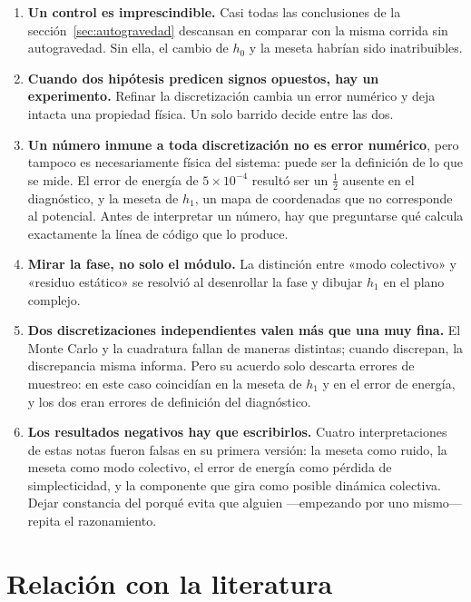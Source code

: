 \documentclass[11pt,a4paper]{article}
\theoremstyle{definition}
\begin{document}
\begin{enumerate}
  \item \textbf{Un control es imprescindible.} Casi todas las conclusiones de la
    sección~\ref{sec:autogravedad} descansan en comparar con la misma corrida sin
    autogravedad. Sin ella, el cambio de $h_0$ y la meseta habrían sido
    inatribuibles.

  \item \textbf{Cuando dos hipótesis predicen signos opuestos, hay un experimento.}
    Refinar la discretización cambia un error numérico y deja intacta una
    propiedad física. Un solo barrido decide entre las dos.

  \item \textbf{Un número inmune a toda discretización no es error numérico}, pero
    tampoco es necesariamente física del sistema: puede ser la definición de lo que
    se mide. El error de energía de $5\times10^{-4}$ resultó ser un $\tfrac12$
    ausente en el diagnóstico, y la meseta de $h_1$, un mapa de coordenadas que no
    corresponde al potencial. Antes de interpretar un número, hay que preguntarse
    qué calcula exactamente la línea de código que lo produce.

  \item \textbf{Mirar la fase, no solo el módulo.} La distinción entre «modo
    colectivo» y «residuo estático» se resolvió al desenrollar la fase y dibujar
    $h_1$ en el plano complejo.

  \item \textbf{Dos discretizaciones independientes valen más que una muy fina.} El
    Monte Carlo y la cuadratura fallan de maneras distintas; cuando discrepan, la
    discrepancia misma informa. Pero su acuerdo solo descarta errores de muestreo:
    en este caso coincidían en la meseta de $h_1$ y en el error de energía, y los dos
    eran errores de definición del diagnóstico.

  \item \textbf{Los resultados negativos hay que escribirlos.} Cuatro
    interpretaciones de estas notas fueron falsas en su primera versión: la meseta
    como ruido, la meseta como modo colectivo, el error de energía como pérdida de
    simplecticidad, y la componente que gira como posible dinámica colectiva. Dejar constancia del porqué evita que alguien ---empezando por
    uno mismo--- repita el razonamiento.
\end{enumerate}

\section{Relación con la literatura}
\label{sec:literatura}
\end{document}
